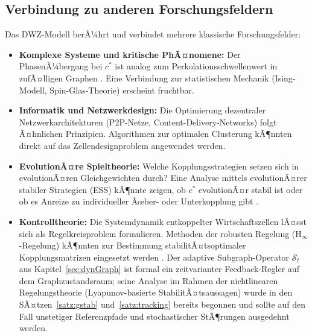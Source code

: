 ﻿\documentclass[a4paper,12pt]{article}
\theoremstyle{definition}
\begin{document}
\subsection{Verbindung zu anderen Forschungsfeldern}

Das DWZ-Modell berÃ¼hrt und verbindet mehrere klassische Forschungsfelder:

\begin{itemize}
    \item \textbf{Komplexe Systeme und kritische PhÃ¤nomene:} Der PhasenÃ¼bergang bei $c^*$
          ist analog zum Perkolationsschwellenwert in zufÃ¤lligen Graphen
          \citep{erdos1960evolution}. Eine Verbindung zur statistischen Mechanik
          (Ising-Modell, Spin-Glas-Theorie) erscheint fruchtbar.

    \item \textbf{Informatik und Netzwerkdesign:} Die Optimierung dezentraler
          Netzwerkarchitekturen (P2P-Netze, Content-Delivery-Networks) folgt Ã¤hnlichen
          Prinzipien. Algorithmen zur optimalen Clusterung \citep{luxburg2007spectral}
          kÃ¶nnten direkt auf das Zellendesignproblem angewendet werden.

    \item \textbf{EvolutionÃ¤re Spieltheorie:} Welche Kopplungsstrategien setzen sich
          in evolutionÃ¤ren Gleichgewichten durch? Eine Analyse mittels evolutionÃ¤rer
          stabiler Strategien (ESS) kÃ¶nnte zeigen, ob $c^*$ evolutionÃ¤r stabil ist
          oder ob es Anreize zu individueller Ãœber- oder Unterkopplung gibt
          \citep{maynardsmith1982evolution}.

    \item \textbf{Kontrolltheorie:} Die Systemdynamik entkoppelter Wirtschaftszellen
          lÃ¤sst sich als Regelkreisproblem formulieren. Methoden der robusten Regelung
          (H$_\infty$-Regelung) kÃ¶nnten zur Bestimmung stabilitÃ¤tsoptimaler
          Kopplungsmatrizen eingesetzt werden \citep{zhou1996robust}. Der adaptive
          Subgraph-Operator $\mathcal{S}_t$ aus Kapitel~\ref{sec:dynGraph} ist
          formal ein zeitvarianter Feedback-Regler auf dem Graphzustandsraum;
          seine Analyse im Rahmen der nichtlinearen Regelungstheorie
          (Lyapunov-basierte StabilitÃ¤tsaussagen) wurde in den SÃ¤tzen~\ref{satz:gstab}
          und~\ref{satz:tracking} bereits begonnen und sollte auf den Fall
          unstetiger Referenzpfade und stochastischer StÃ¶rungen ausgedehnt werden.


\end{itemize}
\end{document}

